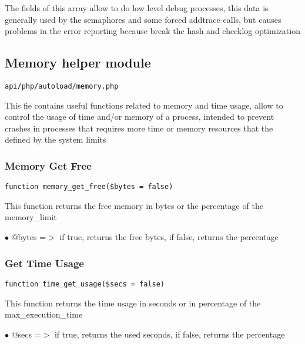 \documentclass[a4paper]{article}
\begin{document}
The fields of this array allow to do low level debug processes, this data is
generally used by the semaphores and some forced addtrace calls, but causes
problems in the error reporting because break the hash and checklog optimization

\hypertarget{toc167}{}
\subsection{Memory helper module}

\begin{lstlisting}
api/php/autoload/memory.php
\end{lstlisting}

This fie contains useful functions related to memory and time usage, allow to control the usage
of time and/or memory of a process, intended to prevent crashes in processes that requires more
time or memory resources that the defined by the system limits

\hypertarget{toc168}{}
\subsubsection{Memory Get Free}

\begin{lstlisting}
function memory_get_free($bytes = false)
\end{lstlisting}

This function returns the free memory in bytes or the percentage of the memory\_limit

\begin{compactitem}
\item[\color{myblue}$\bullet$] @bytes =$>$ if true, returns the free bytes, if false, returns the percentage
\end{compactitem}

\hypertarget{toc169}{}
\subsubsection{Get Time Usage}

\begin{lstlisting}
function time_get_usage($secs = false)
\end{lstlisting}

This function returns the time usage in seconds or in percentage of the max\_execution\_time

\begin{compactitem}
\item[\color{myblue}$\bullet$] @secs =$>$ if true, returns the used seconds, if false, returns the percentage
\end{compactitem}
\end{document}

